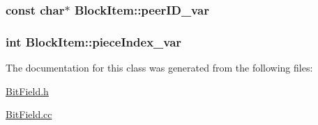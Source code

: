 \subsubsection[{peer\+I\+D\+\_\+var}]{\setlength{\rightskip}{0pt plus 5cm}const char$\ast$ Block\+Item\+::peer\+I\+D\+\_\+var\hspace{0.3cm}{\ttfamily [protected]}}\label{classBlockItem_a2a9222fa374e21edf58c574f402de26a}
\hypertarget{classBlockItem_a4a22399d8eb07f3adc99d570bbe233e3}{}
\subsubsection[{piece\+Index\+\_\+var}]{\setlength{\rightskip}{0pt plus 5cm}int Block\+Item\+::piece\+Index\+\_\+var\hspace{0.3cm}{\ttfamily [protected]}}\label{classBlockItem_a4a22399d8eb07f3adc99d570bbe233e3}


The documentation for this class was generated from the following files\+:\begin{DoxyCompactItemize}
\item 
\hyperlink{BitField_8h}{Bit\+Field.\+h}\item 
\hyperlink{BitField_8cc}{Bit\+Field.\+cc}\end{DoxyCompactItemize}
